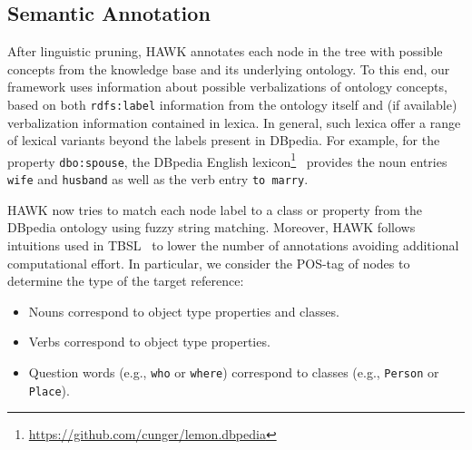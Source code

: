 \subsection{Semantic Annotation}
After linguistic pruning, HAWK annotates each node in the tree with possible concepts from the knowledge base and its underlying ontology.
To this end, our framework uses information about possible verbalizations of ontology concepts, based on both \texttt{rdfs:label} information from the ontology itself and (if available) verbalization information contained in lexica.
In general, such lexica offer a range of lexical variants beyond the labels present in DBpedia. For example, for the property \texttt{dbo:spouse}, the DBpedia English lexicon\footnote{\url{https://github.com/cunger/lemon.dbpedia}}~\cite{dbpedia-lemon} provides the noun entries \texttt{wife} and \texttt{husband} as well as the verb entry \texttt{to marry}.


HAWK now tries to match each node label to a class or property from the DBpedia ontology using fuzzy string matching.
Moreover, HAWK follows intuitions used in TBSL~\cite{template} to lower the number of annotations avoiding additional computational effort. 
In particular, we consider the POS-tag of nodes to determine the type of the target reference:
\begin{itemize}
\item Nouns correspond to object type properties and classes.
\item Verbs correspond to object type properties.
\item Question words (e.g., \texttt{who} or \texttt{where}) correspond to classes (e.g., \texttt{Person} or \texttt{Place}).
\end{itemize}

